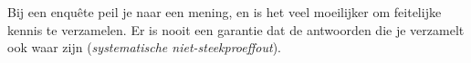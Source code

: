 Bij een enquête peil je naar een mening, en is het veel moeilijker om feitelijke kennis te verzamelen. Er is nooit een garantie dat de antwoorden die je verzamelt ook waar zijn (\emph{systematische niet-steekproeffout}).



%
%


